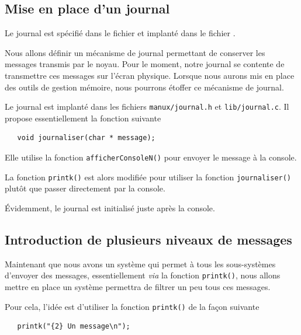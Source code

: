 \subsection{Mise en place d'un journal}

   Le journal est spécifié dans le fichier
 et implanté dans le fichier
.
   
   Nous allons définir un mécanisme de journal permettant de conserver
les messages transmis par le noyau. Pour le moment, notre journal se
contente de transmettre ces messages sur l'écran physique. Lorsque
nous aurons mis en place des outils de gestion mémoire, nous pourrons
étoffer ce mécanisme de journal.

   Le journal est implanté dans les fichiers
\lstinline!manux/journal.h! et \lstinline!lib/journal.c!. Il
propose essentiellement la fonction suivante

\begin{lstlisting}
   void journaliser(char * message); 
\end{lstlisting}

   Elle utilise la fonction \lstinline!afficherConsoleN()! pour
envoyer le message à la console.

   La fonction \lstinline!printk()! est alors modifiée pour utiliser la
fonction \lstinline!journaliser()! plutôt que passer directement par
la console.

   Évidemment, le journal est initialisé juste après la console.

%
\subsection{Introduction de plusieurs niveaux de messages}

   Maintenant que nous avons un système qui permet à tous les
sous-systèmes d'envoyer des messages, essentiellement {\em via} la
fonction \lstinline!printk()!, nous allons mettre en place un système
permettra de filtrer un peu tous ces messages.

   Pour cela, l'idée est d'utiliser la fonction \lstinline!printk()!
de la façon suivante

\begin{lstlisting}
   printk("{2} Un message\n");
\end{lstlisting}

